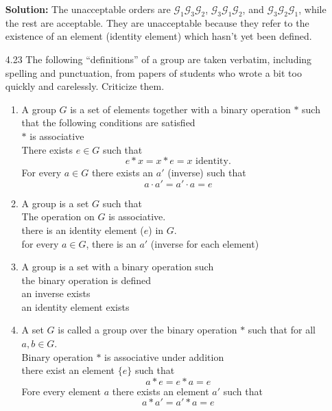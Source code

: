 \begin{enumerate}
      \textbf{Solution:} The unacceptable orders are
      $\mathscr{G}_1\mathscr{G}_3\mathscr{G}_2$,
      $\mathscr{G}_3\mathscr{G}_1\mathscr{G}_2$, and
      $\mathscr{G}_3\mathscr{G}_2\mathscr{G}_1$, while the rest are acceptable.
      They are unacceptable because they refer to the existence of an element 
      (identity element) which hasn't yet been defined.
   \item[4.23] The following ``definitions'' of a group are taken verbatim,
               including spelling and punctuation, from papers of students who
               wrote a bit too quickly and carelessly. Criticize them.
               \begin{enumerate}
                  \item A group $G$ is a set of elements together with a binary
                        operation $*$ such that the following conditions are
                        satisfied \\
                        $*$ is associative \\
                        There exists $e \in G$ such that \\
                        $$e * x = x * e = x \mbox{ identity}.$$
                        For every $a \in G$ there exists an $a'$ (inverse) such
                        that
                        $$a \cdot a' = a' \cdot a = e$$
                  \item A group is a set $G$ such that \\
                        The operation on $G$ is associative. \\
                        there is an identity element ($e$) in $G$. \\
                        for every $a \in G$, there is an $a'$ (inverse for each
                        element)
                  \item A group is a set with a binary operation such \\
                        the binary operation is defined \\
                        an inverse exists \\
                        an identity element exists
                  \item A set $G$ is called a group over the binary operation
                        $*$ such that for all $a, b \in G$. \\
                        Binary operation $*$ is associative under addition \\
                        there exist an element $\{e\}$ such that \\
                        $$a * e = e * a = e$$
                        Fore every element $a$ there exists an element $a'$ such
                        that
                        $$a * a' = a' * a = e$$
               \end{enumerate}


\end{enumerate}
